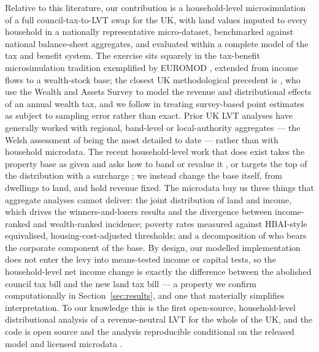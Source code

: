 Relative to this literature, our contribution is a household-level microsimulation of a full council-tax-to-LVT swap for the UK, with land values imputed to every household in a nationally representative micro-dataset, benchmarked against national balance-sheet aggregates, and evaluated within a complete model of the tax and benefit system. The exercise sits squarely in the tax-benefit microsimulation tradition exemplified by EUROMOD \citep{sutherland2013}, extended from income flows to a wealth-stock base; the closest UK methodological precedent is \citet{advani2021}, who use the Wealth and Assets Survey to model the revenue and distributional effects of an annual wealth tax, and we follow \citet{goedeme2013} in treating survey-based point estimates as subject to sampling error rather than exact. Prior UK LVT analyses have generally worked with regional, band-level or local-authority aggregates --- the Welsh assessment of \citet{apgwilym2020} being the most detailed to date --- rather than with household microdata. The recent household-level work that does exist takes the property base as given and asks how to band or revalue it \citep{ifs2025scotland, adam2020}, or targets the top of the distribution with a surcharge \citep{hmt2025}; we instead change the base itself, from dwellings to land, and hold revenue fixed. The microdata buy us three things that aggregate analyses cannot deliver: the joint distribution of land and income, which drives the winners-and-losers results and the divergence between income-ranked and wealth-ranked incidence; poverty rates measured against HBAI-style equivalised, housing-cost-adjusted thresholds; and a decomposition of who bears the corporate component of the base. By design, our modelled implementation does not enter the levy into means-tested income or capital tests, so the household-level net income change is exactly the difference between the abolished council tax bill and the new land tax bill --- a property we confirm computationally in Section~\ref{sec:results}, and one that materially simplifies interpretation. To our knowledge this is the first open-source, household-level distributional analysis of a revenue-neutral LVT for the whole of the UK, and the code is open source and the analysis reproducible conditional on the released model and licensed microdata \citep{policyengine}.
